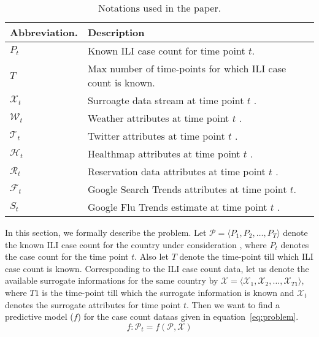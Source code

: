 
\begin{table*}[t!]
  \centering
  \begin{tabular}{|*{2}{l|}}
    \hline
    Abbreviation. & Description \\
    \hline \hline
    ${P}_t$ & Known ILI case count for time point $t$.\\
        $T$ & Max number of time-points for which ILI case count is known.\\
    $\mathcal{X}_t$ & Surroagte data stream at time point $t$ .\\
    $\mathcal{W}_t$ & Weather attributes at time point $t$ .\\
    $\mathcal{T}_t$ & Twitter attributes at time point $t$ .\\
    $\mathcal{H}_t$ & Healthmap attributes at time point $t$ .\\
    $\mathcal{R}_t$ & Reservation data attributes at time point $t$ .\\
    $\mathcal{F}_t$ & Google Search Trends attributes at time point $t$.\\
    ${S}_t$ & Google Flu Trends estimate at time point $t$ .\\
    \hline
  \end{tabular}
  \caption{\label{tb:notations} Notations used in the paper.
  }
\end{table*}

In this section, we formally describe the problem.
Let $\mathcal{P} = \langle {P}_1, {P}_2, \dots,
{P}_T \rangle$ denote the known ILI case count for the country under
consideration , where ${P}_t$  denotes the case count for
the time point $t$.
Also let $T$ denote the time-point till which ILI case count is known.
Corresponding to the ILI case count data, let us denote the available surrogate informations
for the same country by $\mathcal{X} = \langle \mathcal{X}_1, \mathcal{X}_2, 
\dots, \mathcal{X}_{T1}\rangle$, where $T1$ is the time-point till which the surrogate
information is known and $\mathcal{X}_{t}$ denotes the surrogate attributes for time
point $t$. Then we want to find a predictive model ($f$)  for the case count dataas given in  
equation~\ref{eq:problem}.
\begin{equation}
  \label{eq:problem}
  f: \mathcal{P}_t = f\left(\mathcal{P}, \mathcal{X}\right)
\end{equation}


